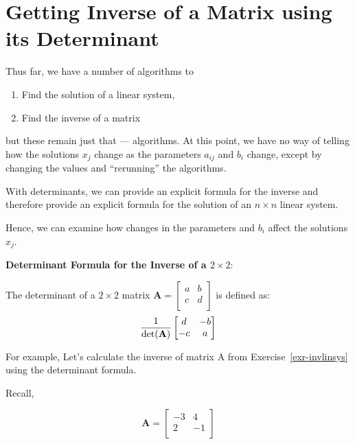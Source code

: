\documentclass[
  letterpaper,
]{book}
\providecommand{\tightlist}{%
  \setlength{\itemsep}{0pt}\setlength{\parskip}{0pt}}\usepackage{longtable,booktabs,array}
\theoremstyle{definition}
\theoremstyle{definition}
\theoremstyle{plain}
\theoremstyle{definition}
\theoremstyle{plain}
\theoremstyle{plain}
\theoremstyle{remark}
\begin{document}
\hypertarget{getting-inverse-of-a-matrix-using-its-determinant}{%
\section{Getting Inverse of a Matrix using its
Determinant}\label{getting-inverse-of-a-matrix-using-its-determinant}}

Thus far, we have a number of algorithms to

\begin{enumerate}
\def\labelenumi{\arabic{enumi}.}
\tightlist
\item
  Find the solution of a linear system,
\item
  Find the inverse of a matrix
\end{enumerate}

but these remain just that --- algorithms. At this point, we have no way
of telling how the solutions \(x_j\) change as the parameters \(a_{ij}\)
and \(b_i\) change, except by changing the values and ``rerunning'' the
algorithms.

With determinants, we can provide an explicit formula for the inverse
and therefore provide an explicit formula for the solution of an
\(n\times n\) linear system.

Hence, we can examine how changes in the parameters and \(b_i\) affect
the solutions \(x_j\).

\textbf{Determinant Formula for the Inverse of a \(2 \times 2\)}:

The determinant of a \(2 \times 2\) matrix
\(\mathbf{A}=\begin{bmatrix} a & b\\ c & d\\ \end{bmatrix}\) is defined
as: \[\frac{1}{\det({\bf A})} \begin{bmatrix}
            d & -b\\
            -c & a\\
        \end{bmatrix}\]

For example, Let's calculate the inverse of matrix A from
Exercise~\ref{exr-invlinsys} using the determinant formula.

Recall,

\[\mathbf{A} = \begin{bmatrix}
            -3 & 4\\
            2 & -1\\
        \end{bmatrix}\]
\end{document}
